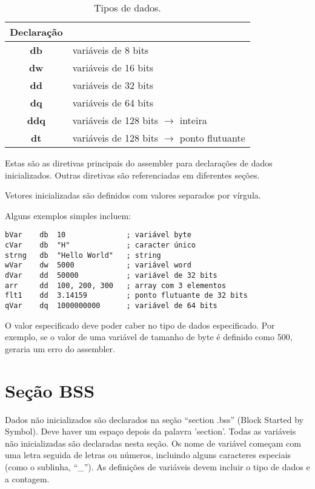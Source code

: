 \begin{table}[]
	\centering
	\begin{tabular}{|c|l|}
		\hline
		\rowcolor[HTML]{C0C0C0} 
		{\color[HTML]{000000} } Declaração & {\color[HTML]{000000} } \\ \hline
		\textbf{db}& variáveis de 8 bits \\ \hline
		\textbf{dw} & variáveis de 16 bits\\ \hline
		\textbf{dd} & variáveis de 32 bits\\ \hline
		\textbf{dq} & variáveis de 64 bits\\ \hline
		\textbf{ddq} & variáveis de 128 bits $\rightarrow$ inteira\\ \hline
		\textbf{dt} & variáveis de 128 bits $\rightarrow$ ponto flutuante\\ \hline
	\end{tabular}
\caption{Tipos de dados.}
\label{tab:tiposDeDados}
\end{table}

Estas são as diretivas principais do assembler para declarações de dados inicializados. Outras diretivas são referenciadas em diferentes seções.

Vetores inicializadas são definidos com valores separados por vírgula.

Alguns exemplos simples incluem:

\begin{verbatim}
bVar    db  10              ; variável byte
cVar    db  "H"             ; caracter único
strng   db  "Hello World"   ; string
wVar    dw 	5000            ; variável word
dVar    dd 	50000           ; variável de 32 bits
arr     dd 	100, 200, 300   ; array com 3 elementos
flt1    dd 	3.14159         ; ponto flutuante de 32 bits
qVar    dq 	1000000000      ; variável de 64 bits
\end{verbatim}

O valor especificado deve poder caber no tipo de dados especificado. Por exemplo, se o valor de uma variável de tamanho de byte é definido como 500, geraria um erro do assembler.

\section{Seção BSS}
Dados não inicializados são declarados na seção ``section .bss'' (Block Started by Symbol). Deve haver um espaço depois da palavra 'section'. Todas as 
variáveis não inicializadas são declaradas nesta seção. Os nome de variável começam com uma letra seguida de letras ou números, incluindo alguns caracteres especiais (como o sublinha, ``\_''). As definições de variáveis devem incluir o tipo de dados e a contagem.

